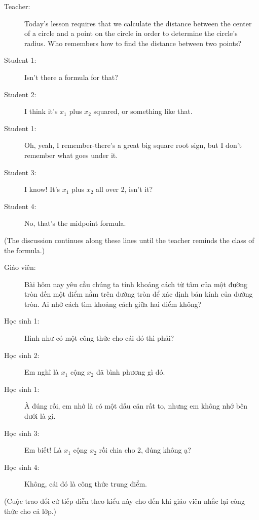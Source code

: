 \documentclass[
  10pt,
  a4paper,
  landscape,
  twoside,
  openany
]{scrbook}
\newcommand{\EN}[1]{#1}
\newcommand{\VI}[1]{#1}
\begin{document}
\TriPara
{
\EN{
\begin{description}
  \item [Teacher:] Today's lesson requires that we calculate the distance between the center of a circle and a point on the circle in order to determine the circle's radius. Who remembers how to find the distance between two points?
  \item [Student 1:] Isn't there a formula for that?
  \item [Student 2:] I think it's $x_1$ plus $x_2$ squared, or something like that.
  \item [Student 1:] Oh, yeah, I remember-there's a great big square root sign, but I don't remember what goes under it.
  \item [Student 3:] I know! It's $x_1$ plus $x_2$ all over 2, isn't it?
  \item [Student 4:] No, that's the midpoint formula.
\end{description}
(The discussion continues along these lines until the teacher reminds the class of the formula.)}
}
{
\VI{
\begin{description}
  \item[Giáo viên:] Bài hôm nay yêu cầu chúng ta tính khoảng cách từ tâm của một đường tròn đến một điểm nằm trên đường tròn để xác định bán kính của đường tròn. Ai nhớ cách tìm khoảng cách giữa hai điểm không?
  \item[Học sinh 1:] Hình như có một công thức cho cái đó thì phải?
  \item[Học sinh 2:] Em nghĩ là $x_1$ cộng $x_2$ đã bình phương gì đó.
  \item[Học sinh 1:] À đúng rồi, em nhớ là có một dấu căn rất to, nhưng em không nhớ bên dưới là gì.
  \item[Học sinh 3:] Em biết! Là $x_1$ cộng $x_2$ rồi chia cho 2, đúng không ạ?
  \item[Học sinh 4:] Không, cái đó là công thức trung điểm.
\end{description}
(Cuộc trao đổi cứ tiếp diễn theo kiểu này cho đến khi giáo viên nhắc lại công thức cho cả lớp.)}
}
\end{document}
